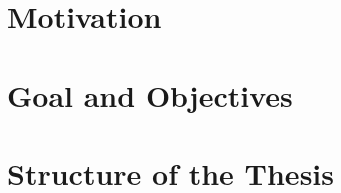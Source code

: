 \documentclass[a4paper, UKenglish, 11pt]{uiomaster}
\begin{document}
\section{Motivation}
\section{Goal and Objectives}
\section{Structure of the Thesis}
\end{document}
